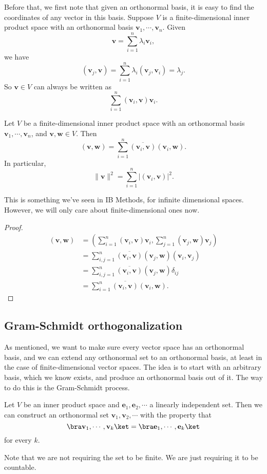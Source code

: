 \documentclass[a4paper]{article}
\begin{document}
Before that, we first note that given an orthonormal basis, it is easy to find the coordinates of any vector in this basis. Suppose $V$ is a finite-dimensional inner product space with an orthonormal basis $\mathbf{v}_1, \cdots, \mathbf{v}_n$. Given
\[
  \mathbf{v} = \sum_{i = 1}^n \lambda_i \mathbf{v}_i,
\]
we have
\[
  (\mathbf{v}_j, \mathbf{v}) = \sum_{i = 1}^n \lambda_i (\mathbf{v}_j, \mathbf{v}_i) = \lambda_j.
\]
So $\mathbf{v} \in V$ can always be written as
\[
  \sum_{i = 1}^n (\mathbf{v}_i, \mathbf{v}) \mathbf{v}_i.
\]
\begin{lemma}
  Let $V$ be a finite-dimensional inner product space with an orthonormal basis $\mathbf{v}_1, \cdots, \mathbf{v}_n$, and $\mathbf{v}, \mathbf{w} \in V$. Then
  \[
    (\mathbf{v}, \mathbf{w}) = \sum_{i = 1}^n \overline{(\mathbf{v}_i, \mathbf{v})} (\mathbf{v}_i, \mathbf{w}).
  \]
  In particular,
  \[
    \|\mathbf{v}\|^2 = \sum_{i = 1}^n |(\mathbf{v}_i, \mathbf{v})|^2.
  \]
\end{lemma}
This is something we've seen in IB Methods, for infinite dimensional spaces. However, we will only care about finite-dimensional ones now.

\begin{proof}
  \begin{align*}
    (\mathbf{v}, \mathbf{w}) &= \left(\sum_{i = 1}^n (\mathbf{v}_i, \mathbf{v}) \mathbf{v}_i, \sum_{j = 1}^n (\mathbf{v}_j, \mathbf{w}) \mathbf{v}_j\right)\\
    &= \sum_{i, j = 1}^n \overline{(\mathbf{v}_i, \mathbf{v})} (\mathbf{v}_j, \mathbf{w}) (\mathbf{v}_i, \mathbf{v}_j)\\
    &= \sum_{i, j = 1}^n \overline{(\mathbf{v}_i, \mathbf{v})} (\mathbf{v}_j, \mathbf{w}) \delta_{ij}\\
    &= \sum_{i = 1}^n \overline{(\mathbf{v}_i, \mathbf{v})} (\mathbf{v}_i, \mathbf{w}).
  \end{align*}
\end{proof}

\subsection{Gram-Schmidt orthogonalization}
As mentioned, we want to make sure every vector space has an orthonormal basis, and we can extend any orthonormal set to an orthonormal basis, at least in the case of finite-dimensional vector spaces. The idea is to start with an arbitrary basis, which we know exists, and produce an orthonormal basis out of it. The way to do this is the Gram-Schmidt process.
\begin{thm}
  Let $V$ be an inner product space and $\mathbf{e}_1, \mathbf{e}_2, \cdots$ a linearly independent set. Then we can construct an orthonormal set $\mathbf{v}_1, \mathbf{v}_2, \cdots$ with the property that
  \[
    \bra \mathbf{v}_1, \cdots, \mathbf{v}_k\ket = \bra \mathbf{e}_1, \cdots, \mathbf{e}_k\ket
  \]
  for every $k$.
\end{thm}
Note that we are not requiring the set to be finite. We are just requiring it to be countable.
\end{document}
